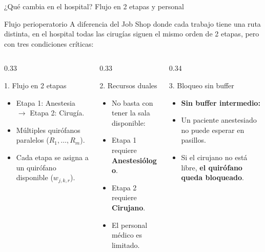\documentclass[aspectratio=169,11pt]{beamer}
\newcommand{\risk}[1]{\textcolor{warn}{\textbf{#1}}}
\begin{document}
\begin{frame}{¿Qué cambia en el hospital? Flujo en 2 etapas y personal}
  \begin{block}{Flujo perioperatorio}
    A diferencia del Job Shop donde cada trabajo tiene una ruta distinta, en el hospital todas las cirugías siguen el mismo orden de 2 etapas, pero con tres condiciones críticas:
  \end{block}

  \begin{columns}[t]
    \begin{column}{0.33\textwidth}
      \begin{block}{1. Flujo en 2 etapas}
        \footnotesize
        \begin{itemize}
          \item Etapa 1: Anestesia $\to$ Etapa 2: Cirugía.
          \item Múltiples quirófanos paralelos ($R_1, \dots, R_m$).
          \item Cada etapa se asigna a un quirófano disponible ($w_{j,k,r}$).
        \end{itemize}
      \end{block}
    \end{column}

    \begin{column}{0.33\textwidth}
      \begin{alertblock}{2. Recursos duales}
        \footnotesize
        \begin{itemize}
          \item No basta con tener la sala disponible:
          \item Etapa 1 requiere \textcolor{anestcolor}{\textbf{Anestesiólogo}}.
          \item Etapa 2 requiere \textcolor{surgcolor}{\textbf{Cirujano}}.
          \item El personal médico es limitado.
        \end{itemize}
      \end{alertblock}
    \end{column}

    \begin{column}{0.34\textwidth}
      \begin{alertblock}{3. Bloqueo sin buffer}
        \footnotesize
        \begin{itemize}
          \item \textbf{Sin buffer intermedio:}
          \item Un paciente anestesiado no puede esperar en pasillos.
          \item Si el cirujano no está libre, \risk{el quirófano queda bloqueado}.
        \end{itemize}
      \end{alertblock}
    \end{column}
  \end{columns}
\end{frame}
\end{document}
